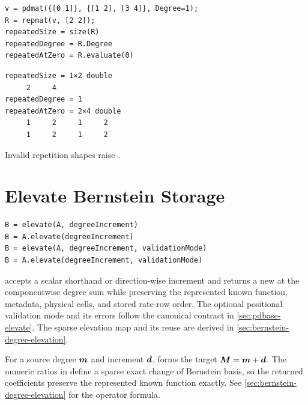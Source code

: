 \examplehead
\begin{lstlisting}[style=dpmatlab]
v = pdmat({[0 1]}, {[1 2], [3 4]}, Degree=1);
R = repmat(v, [2 2]);
repeatedSize = size(R)
repeatedDegree = R.Degree
repeatedAtZero = R.evaluate(0)
\end{lstlisting}

\begin{lstlisting}[style=dpoutput]
repeatedSize = 1×2 double
     2     4
repeatedDegree = 1
repeatedAtZero = 2×4 double
     1     2     1     2
     1     2     1     2
\end{lstlisting}

Invalid repetition shapes raise .

\section{\texorpdfstring{\hspace{0.5em}Elevate  Bernstein Storage}{Elevate pdmat Bernstein Storage}}
\label{sec:pdmat-elevate}

\syntaxhead
\begin{lstlisting}[style=dpsyntax]
B = elevate(A, degreeIncrement)
B = A.elevate(degreeIncrement)
B = elevate(A, degreeIncrement, validationMode)
B = A.elevate(degreeIncrement, validationMode)
\end{lstlisting}

\descriptionhead
{} accepts a scalar shorthand or direction-wise increment and returns a new  at the componentwise degree sum while preserving the represented known function, metadata, physical cells, and stored rate-row order. The optional positional validation mode and its errors follow the canonical contract in \cref{sec:pdbase-elevate}. The sparse elevation map and its reuse are derived in \cref{sec:bernstein-degree-elevation}.

For a source degree $\boldsymbol{m}$ and increment $\boldsymbol{d}$,  forms the target $\boldsymbol{M}=\boldsymbol{m}+\boldsymbol{d}$. The numeric ratios in  define a sparse exact change of Bernstein basis, so the returned coefficients preserve the represented known function exactly. See \cref{sec:bernstein-degree-elevation} for the operator formula.

